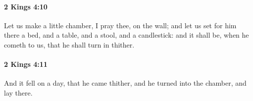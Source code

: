 		\paragraph{2 Kings 4:10} %
			\label{2KINGS-4-10}

			Let us make a little chamber, I pray thee, on the wall; and let us set for him there a bed, and a table, and a stool, and a candlestick: and it shall be, when he cometh to us, that he shall turn in thither.


		\paragraph{2 Kings 4:11} %
			\label{2KINGS-4-11}

			And it fell on a day, that he came thither, and he turned into the chamber, and lay there.


